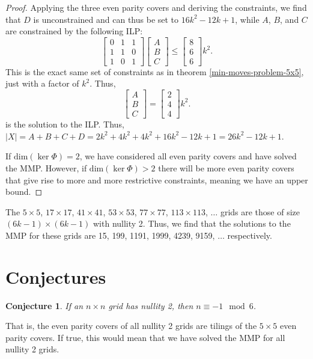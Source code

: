 \documentclass[a4paper]{article}
\newtheorem{conjecture}{Conjecture}
\newcommand{\abs}[1]{\left| #1 \right|}
\renewcommand{\dim}[1]{\text{dim}\left( #1 \right)}
\begin{document}
\begin{proof}
		Applying the three even parity covers and deriving the constraints, we find that $D$ is unconstrained and can thus be set to $16k^2 - 12k + 1$, while $A$, $B$, and $C$ are constrained by the following ILP:
		\begin{equation}
			\begin{bmatrix}
				0 & 1 & 1 \\
				1 & 1 & 0 \\
				1 & 0 & 1 
			\end{bmatrix}
			\begin{bmatrix}
				A \\
				B \\
				C
			\end{bmatrix}
			\leq
			\begin{bmatrix}
				8 \\
				6 \\
				6
			\end{bmatrix}k^2.
		\end{equation}
		This is the exact same set of constraints as in theorem \ref{min-moves-problem-5x5}, just with a factor of $k^2$.
		Thus,
		\begin{equation*}
			\begin{bmatrix}
				A \\
				B \\
				C
			\end{bmatrix}
			=
			\begin{bmatrix}
				2 \\
				4 \\
				4
			\end{bmatrix}k^2.
		\end{equation*}
		is the solution to the ILP.
		Thus, $\abs{X} = A + B + C + D = 2k^2 + 4k^2 +  4k^2 + 16k^2 - 12k + 1 = 26k^2 - 12k + 1$.
		
		If $\dim{\ker{\Phi}} = 2$, we have considered all even parity covers and have solved the MMP.
		However, if $\dim{\ker{\Phi}} > 2$ there will be more even parity covers that give rise to more and more restrictive constraints, meaning we have an upper bound.
	\end{proof}

	The $5 \times 5$, $17 \times 17$, $41 \times 41$, $53 \times 53$, $77 \times 77$, $113 \times 113$, $\dots$ grids are those of size $(6k-1) \times (6k-1)$ with nullity 2.
	Thus, we find that the solutions to the MMP for these grids are 15, 199, 1191, 1999, 4239, 9159, $\dots$ respectively.
	
	\section{Conjectures}
	\begin{conjecture}\label{all-nullity2-conj}
		If an $n \times n$ grid has nullity 2, then $n \equiv -1 \mod 6$.
	\end{conjecture}
	That is, the even parity covers of all nullity 2 grids are tilings of the $5 \times 5$ even parity covers.
	If true, this would mean that we have solved the MMP for all nullity 2 grids.
	
\end{document}
